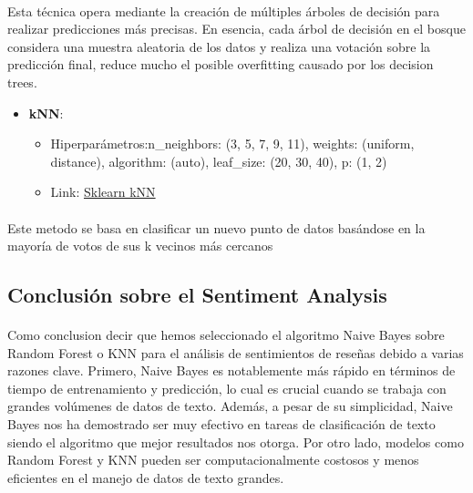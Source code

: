 \documentclass{report}
\begin{document}
                \paragraph*{} {
                Esta técnica opera mediante la creación de múltiples árboles de decisión para realizar predicciones más precisas. En esencia, cada árbol de decisión en el bosque considera una muestra aleatoria de los datos y realiza una votación sobre la predicción final, reduce mucho el posible overfitting causado por los decision trees. 
                }
                \begin{itemize}
                    \item\textbf{kNN}:
                    \begin{itemize}
                        \item {Hiperparámetros:n\_neighbors: (3, 5, 7, 9, 11), weights: (uniform, distance), algorithm: (auto), leaf\_size: (20, 30, 40), p: (1, 2)}
                        \item Link: \href{https://scikit-learn.org/stable/modules/generated/sklearn.neighbors.KNeighborsClassifier.html}{Sklearn kNN}
                    \end{itemize} 
                \end{itemize}
                \paragraph*{}{
                Este metodo se basa en clasificar un nuevo punto de datos basándose en la mayoría de votos de sus k vecinos más cercanos
                }
            \subsection{Conclusión sobre el Sentiment Analysis}
                \paragraph*{}{
                    Como conclusion decir que
                    hemos seleccionado el algoritmo Naive Bayes sobre Random Forest o KNN para el análisis de sentimientos de reseñas debido a varias razones clave. Primero, Naive Bayes es notablemente más rápido en términos de tiempo de entrenamiento y predicción, lo cual es crucial cuando se trabaja con grandes volúmenes de datos de texto. Además, a pesar de su simplicidad, Naive Bayes nos ha demostrado ser muy efectivo en tareas de clasificación de texto siendo el algoritmo que mejor resultados nos otorga. Por otro lado, modelos como Random Forest y KNN pueden ser computacionalmente costosos y menos eficientes en el manejo de datos de texto grandes.
                }
\end{document}

